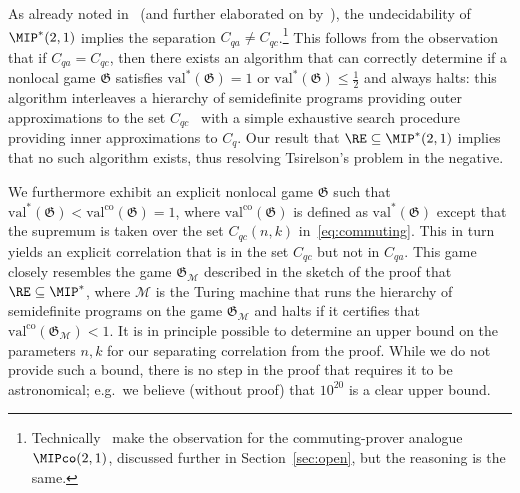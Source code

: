 \documentclass[11pt]{article}
\theoremstyle{definition}
\newcommand{\val}{\ensuremath{\mathrm{val}}}
\newcommand{\valco}{\ensuremath{\mathrm{val}^{\mathrm{co}}}}
\newcommand{\game}{\mathfrak{G}}
\newcommand{\machine}{\cal{M}}
\renewcommand{\cal}[1]{\mathcal{#1}}
\begin{document}
As already noted in~\cite{fritz2014can} (and further elaborated on by~\cite{fitzsimons2018quantum}), the undecidability of $\MIP^*(2,1)$ implies the separation $C_{qa} \neq C_{qc}$.\footnote{Technically~\cite{fritz2014can} make the observation for the commuting-prover analogue $\MIPco(2,1)$, discussed further in Section~\ref{sec:open}, but the reasoning is the same.} This follows from the observation that if $C_{qa} = C_{qc}$, then there exists an algorithm that can correctly determine if a nonlocal game $\game$ satisfies $\val^*(\game)=1$ or $\val^*(\game)\leq  \frac{1}{2}$ and always halts: this algorithm interleaves a hierarchy of semidefinite programs providing outer approximations to the set $C_{qc}$~\cite{navascues2008convergent,doherty2008quantum} with a simple exhaustive search procedure providing inner approximations to $C_{q}$. Our result that $\RE \subseteq \MIP^*(2,1)$ implies that no such algorithm exists, thus resolving Tsirelson's problem in the negative.

We furthermore exhibit an explicit nonlocal game $\game$ such that $\val^*(\game) < \valco(\game) = 1$, where $\valco(\game)$ is defined as $\val^*(\game)$ except that the supremum is taken over the set $C_{qc}(n,k)$ in~\eqref{eq:commuting}. This in turn yields an explicit correlation that is in the set $C_{qc}$ but not in $C_{qa}$. 
This game closely resembles the game $\game_\machine$ described in the sketch of the proof that $\RE \subseteq \MIP^*$, where $\machine$ is the Turing machine that runs the hierarchy of semidefinite programs on the game $\game_\machine$ and halts if it certifies that $\valco(\game_\machine) < 1$. It is in principle possible to determine an upper bound on the parameters $n,k$ for our separating correlation from the proof. While we do not provide such a bound, there is no step in the proof that requires it to be astronomical; e.g.\ we believe (without proof) that $10^{20}$ is a clear upper bound.
\end{document}
